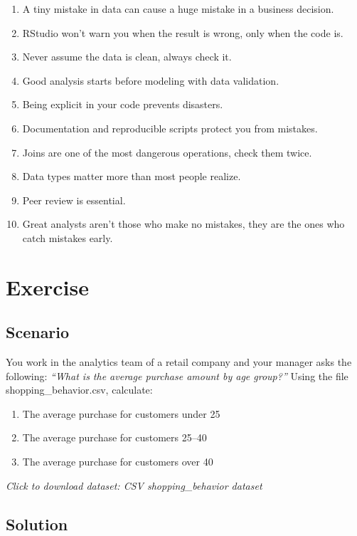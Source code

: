 \documentclass[
  stu,
  floatsintext,
  longtable,
  a4paper,
  nolmodern,
  notxfonts,
  notimes,
  colorlinks=true,linkcolor=blue,citecolor=blue,urlcolor=blue]{apa7}
\providecommand{\tightlist}{%
  \setlength{\itemsep}{0pt}\setlength{\parskip}{0pt}}
\begin{document}
\begin{enumerate}
\def\labelenumi{\arabic{enumi}.}
\tightlist
\item
  A tiny mistake in data can cause a huge mistake in a business
  decision.
\item
  RStudio won't warn you when the result is wrong, only when the code
  is.
\item
  Never assume the data is clean, always check it.
\item
  Good analysis starts before modeling with data validation.
\item
  Being explicit in your code prevents disasters.
\item
  Documentation and reproducible scripts protect you from mistakes.
\item
  Joins are one of the most dangerous operations, check them twice.
\item
  Data types matter more than most people realize.
\item
  Peer review is essential.
\item
  Great analysts aren't those who make no mistakes, they are the ones
  who catch mistakes early.
\end{enumerate}

\section{Exercise}\label{exercise}

\subsection{Scenario}\label{scenario}

You work in the analytics team of a retail company and your manager asks
the following: \emph{``What is the average purchase amount by age
group?''} Using the file shopping\_behavior.csv, calculate:

\begin{enumerate}
\def\labelenumi{\arabic{enumi}.}
\item
  The average purchase for customers under 25
\item
  The average purchase for customers 25--40
\item
  The average purchase for customers over 40
\end{enumerate}

\emph{Click to download dataset: CSV shopping\_behavior dataset}

\subsection{Solution}\label{solution}
\end{document}
